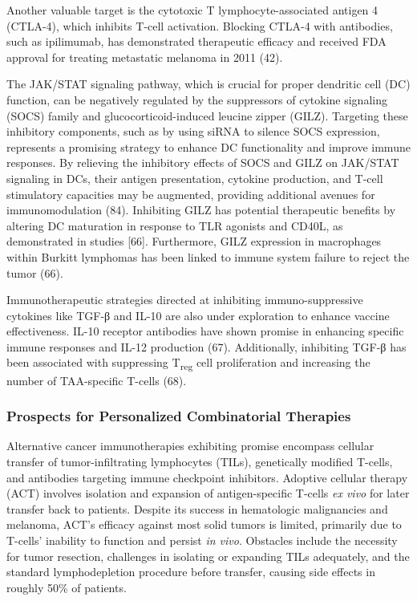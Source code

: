 \documentclass[
]{article}
\begin{document}
Another valuable target is the cytotoxic T lymphocyte-associated antigen
4 (CTLA-4), which inhibits T-cell activation. Blocking CTLA-4 with
antibodies, such as ipilimumab, has demonstrated therapeutic efficacy
and received FDA approval for treating metastatic melanoma in 2011 (42).

The JAK/STAT signaling pathway, which is crucial for proper dendritic
cell (DC) function, can be negatively regulated by the suppressors of
cytokine signaling (SOCS) family and glucocorticoid-induced leucine
zipper (GILZ). Targeting these inhibitory components, such as by using
siRNA to silence SOCS expression, represents a promising strategy to
enhance DC functionality and improve immune responses. By relieving the
inhibitory effects of SOCS and GILZ on JAK/STAT signaling in DCs, their
antigen presentation, cytokine production, and T-cell stimulatory
capacities may be augmented, providing additional avenues for
immunomodulation (84). Inhibiting GILZ has potential therapeutic
benefits by altering DC maturation in response to TLR agonists and
CD40L, as demonstrated in studies {[}66{]}. Furthermore, GILZ expression
in macrophages within Burkitt lymphomas has been linked to immune system
failure to reject the tumor (66).

Immunotherapeutic strategies directed at inhibiting immuno-suppressive
cytokines like TGF-β and IL-10 are also under exploration to enhance
vaccine effectiveness. IL-10 receptor antibodies have shown promise in
enhancing specific immune responses and IL-12 production (67).
Additionally, inhibiting TGF-β has been associated with suppressing
T\textsubscript{reg} cell proliferation and increasing the number of
TAA-specific T-cells (68).

\subsubsection{Prospects for Personalized Combinatorial
Therapies}\label{prospects-for-personalized-combinatorial-therapies}

Alternative cancer immunotherapies exhibiting promise encompass cellular
transfer of tumor-infiltrating lymphocytes (TILs), genetically modified
T-cells, and antibodies targeting immune checkpoint inhibitors. Adoptive
cellular therapy (ACT) involves isolation and expansion of
antigen-specific T-cells \emph{ex vivo} for later transfer back to
patients. Despite its success in hematologic malignancies and melanoma,
ACT's efficacy against most solid tumors is limited, primarily due to
T-cells' inability to function and persist \emph{in vivo}. Obstacles
include the necessity for tumor resection, challenges in isolating or
expanding TILs adequately, and the standard lymphodepletion procedure
before transfer, causing side effects in roughly 50\% of patients.
\end{document}
